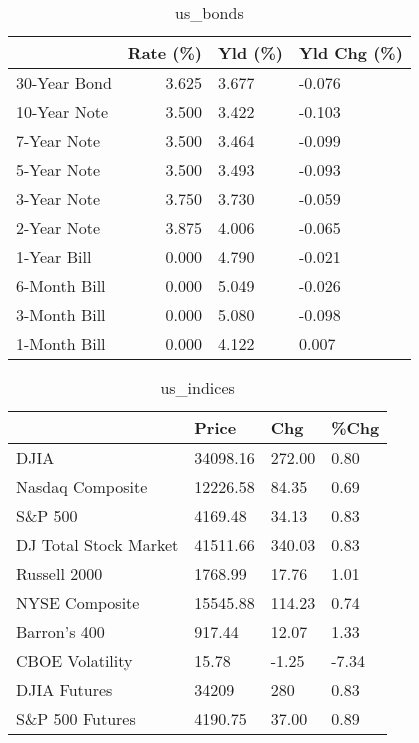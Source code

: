 \documentclass{article}%
\begin{document}
\begin{table}[htbp]%
\caption{us\_bonds}%
\centering%
\begin{adjustbox}{width=1\textwidth}%
\begin{tabular}{lrll}
\toprule
             &  Rate (\%) & Yld (\%) & Yld Chg (\%) \\
\midrule
30-Year Bond &     3.625 &   3.677 &      -0.076 \\
10-Year Note &     3.500 &   3.422 &      -0.103 \\
 7-Year Note &     3.500 &   3.464 &      -0.099 \\
 5-Year Note &     3.500 &   3.493 &      -0.093 \\
 3-Year Note &     3.750 &   3.730 &      -0.059 \\
 2-Year Note &     3.875 &   4.006 &      -0.065 \\
 1-Year Bill &     0.000 &   4.790 &      -0.021 \\
6-Month Bill &     0.000 &   5.049 &      -0.026 \\
3-Month Bill &     0.000 &   5.080 &      -0.098 \\
1-Month Bill &     0.000 &   4.122 &       0.007 \\
\bottomrule
\end{tabular}
%
\end{adjustbox}%
\end{table}

%


\begin{table}[htbp]%
\caption{us\_indices}%
\centering%
\begin{adjustbox}{width=1\textwidth}%
\begin{tabular}{llll}
\toprule
                      &    Price &    Chg &  \%Chg \\
\midrule
                 DJIA & 34098.16 & 272.00 &  0.80 \\
     Nasdaq Composite & 12226.58 &  84.35 &  0.69 \\
              S\&P 500 &  4169.48 &  34.13 &  0.83 \\
DJ Total Stock Market & 41511.66 & 340.03 &  0.83 \\
         Russell 2000 &  1768.99 &  17.76 &  1.01 \\
       NYSE Composite & 15545.88 & 114.23 &  0.74 \\
         Barron's 400 &   917.44 &  12.07 &  1.33 \\
      CBOE Volatility &    15.78 &  -1.25 & -7.34 \\
         DJIA Futures &    34209 &    280 &  0.83 \\
      S\&P 500 Futures &  4190.75 &  37.00 &  0.89 \\
\bottomrule
\end{tabular}
%
\end{adjustbox}%
\end{table}
\end{document}
